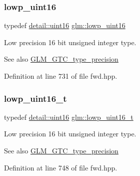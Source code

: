 \subsubsection{\texorpdfstring{lowp\+\_\+uint16}{lowp\_uint16}}
{\footnotesize\ttfamily typedef \hyperlink{namespaceglm_1_1detail_a47b2a7d006d187338e8031a352d1ce56}{detail\+::uint16} \hyperlink{group__gtc__type__precision_ga9b8409887319f62f06e664f6ca121b9d}{glm\+::lowp\+\_\+uint16}}

Low precision 16 bit unsigned integer type. \begin{DoxySeeAlso}{See also}
\hyperlink{group__gtc__type__precision}{G\+L\+M\+\_\+\+G\+T\+C\+\_\+type\+\_\+precision} 
\end{DoxySeeAlso}


Definition at line 731 of file fwd.\+hpp.

\mbox{\label{group__gtc__type__precision_ga9a71176a4e5bc61951f9e9197d9c80e1}} 
\subsubsection{\texorpdfstring{lowp\+\_\+uint16\+\_\+t}{lowp\_uint16\_t}}
{\footnotesize\ttfamily typedef \hyperlink{namespaceglm_1_1detail_a47b2a7d006d187338e8031a352d1ce56}{detail\+::uint16} \hyperlink{group__gtc__type__precision_ga9a71176a4e5bc61951f9e9197d9c80e1}{glm\+::lowp\+\_\+uint16\+\_\+t}}

Low precision 16 bit unsigned integer type. \begin{DoxySeeAlso}{See also}
\hyperlink{group__gtc__type__precision}{G\+L\+M\+\_\+\+G\+T\+C\+\_\+type\+\_\+precision} 
\end{DoxySeeAlso}


Definition at line 748 of file fwd.\+hpp.

\mbox{\label{group__gtc__type__precision_gaf11e85af414720b4cd12bd57b3a81e68}} 
